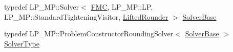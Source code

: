 \begin{DoxyCompactItemize}
\item 
typedef L\+P\+\_\+\+M\+P\+::\+Solver$<$ \hyperlink{classnifty_1_1graph_1_1lifted__multicut_1_1LiftedMulticutMp_a66bb20962d2d51acdfa1ba2e12156b61}{F\+M\+C}, L\+P\+\_\+\+M\+P\+::\+L\+P, L\+P\+\_\+\+M\+P\+::\+Standard\+Tightening\+Visitor, \hyperlink{structnifty_1_1graph_1_1lifted__multicut_1_1LiftedMulticutMp_1_1LiftedRounder}{Lifted\+Rounder} $>$ \hyperlink{classnifty_1_1graph_1_1lifted__multicut_1_1LiftedMulticutMp_af9810af21796143a4ae499e061e5f80c}{Solver\+Base}
\item 
typedef L\+P\+\_\+\+M\+P\+::\+Problem\+Constructor\+Rounding\+Solver$<$ \hyperlink{classnifty_1_1graph_1_1lifted__multicut_1_1LiftedMulticutMp_af9810af21796143a4ae499e061e5f80c}{Solver\+Base} $>$ \hyperlink{classnifty_1_1graph_1_1lifted__multicut_1_1LiftedMulticutMp_a74937c2d33c809a39472710855ae7d8a}{Solver\+Type}
\end{DoxyCompactItemize}
